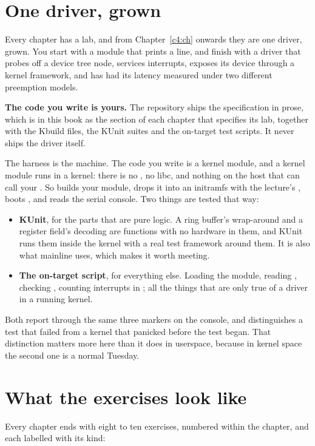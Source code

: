 \section*{One driver, grown}
Every chapter has a lab, and from Chapter~\ref{c4:ch} onwards they are one driver, grown. You start
with a module that prints a line, and finish with a driver that probes off a device tree node,
services interrupts, exposes its device through a kernel framework, and has had its latency
measured under two different preemption models.

\textbf{The code you write is yours.} The repository ships the specification in prose, which is in
this book as the section of each chapter that specifies its lab, together with the Kbuild files,
the KUnit suites and the on-target test scripts. It never ships the driver itself.

The harness is the machine. The code you write is a kernel module, and a kernel module runs in a
kernel: there is no , no libc, and nothing on the host that can call your
. So  builds your module, drops it into an initramfs with the
lecture's , boots , and reads the serial console. Two things
are tested that way:
\begin{itemize}
  \item \textbf{KUnit}, for the parts that are pure logic. A ring buffer's wrap-around and a
    register field's decoding are functions with no hardware in them, and KUnit runs them inside the
    kernel with a real test framework around them. It is also what mainline uses, which makes it
    worth meeting.
  \item \textbf{The on-target script}, for everything else. Loading the module, reading ,
    checking , counting interrupts in ; all the things that are
    only true of a driver in a running kernel.
\end{itemize}
Both report through the same three markers on the console, and  distinguishes a
test that failed from a kernel that panicked before the test began. That distinction matters more
here than it does in userspace, because in kernel space the second one is a normal Tuesday.

\section*{What the exercises look like}
Every chapter ends with eight to ten exercises, numbered within the chapter, and each labelled with
its kind:


